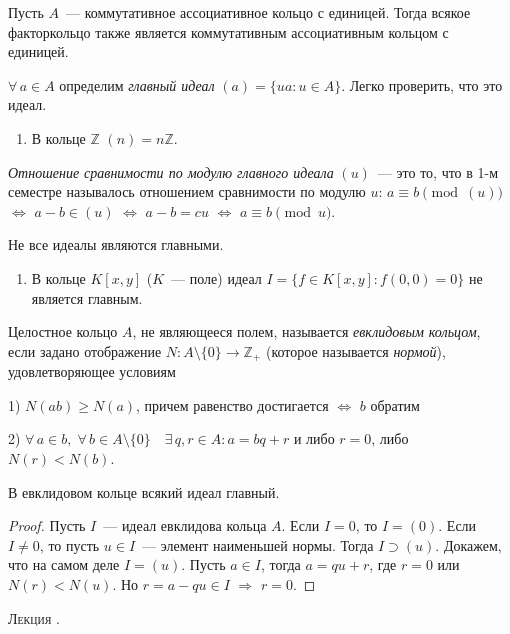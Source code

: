 \documentclass[a4paper]{article}
\newcounter{lec}
\renewcommand{\thelec}{\Roman{lec}}
\newcommand*{\lecture}[1]{\refstepcounter{lec}\vspace{20pt}
\begin{center}{\rmfamily\textsc{Лекция \thelec. \\ \textbf{#1}}}\vspace{5pt}
\end{center}}
\begin{document}
Пусть $A$~--- коммутативное ассоциативное кольцо с единицей. Тогда
всякое факторкольцо также является коммутативным ассоциативным
кольцом с единицей.

$\forall \, a\in A$ определим \emph{главный идеал} $(a)=\{ua: u\in
A\}$. Легко проверить, что это идеал.

\prim
\begin{enumerate}
  \item В кольце $\mathbb{Z}$ $(n)=n\mathbb{Z}$.
\end{enumerate}

\emph{Отношение сравнимости по модулю главного идеала} $(u)$~--- это
то, что в 1-м семестре называлось отношением сравнимости по модулю
$u$: $a\equiv b\pmod{(u)}$ $\Leftrightarrow$ $a-b\in(u)$
$\Leftrightarrow$ $a-b=cu$ $\Leftrightarrow$ $a\equiv b\pmod{u}$.

Не все идеалы являются главными.

\prim
\begin{enumerate}
  \item В кольце $K[x,y]$ ($K$~--- поле) идеал $I=\{f\in K[x,y]:
  f(0,0)=0\}$ не является главным.
\end{enumerate}

Целостное кольцо $A$, не являющееся полем, называется
\emph{евклидовым кольцом}, если задано отображение $N\colon
A\setminus \{0\}\to \mathbb{Z}_+$ (которое называется
\emph{нормой}), удовлетворяющее условиям

1) $N(ab)\geqslant N(a)$, причем равенство достигается
$\Leftrightarrow$ $b$ обратим

2) $\forall \, a\in b,\; \forall \, b\in A\setminus \{0\}\quad
\exists \, q,r\in A: a=bq+r$ и либо $r=0$, либо $N(r)<N(b)$.

\begin{theorem}
В евклидовом кольце всякий идеал главный.
\end{theorem}

\begin{proof}
Пусть $I$~--- идеал евклидова кольца $A$. Если $I=0$, то $I=(0)$.
Если $I\neq 0$, то пусть $u\in I$~--- элемент наименьшей нормы.
Тогда $I\supset (u)$. Докажем, что на самом деле $I=(u)$. Пусть
$a\in I$, тогда $a=qu+r$, где $r=0$ или $N(r)<N(u)$. Но $r=a-qu\in
I$ $\Rightarrow$ $r=0$.
\end{proof}
\lecture{}
\end{document}
